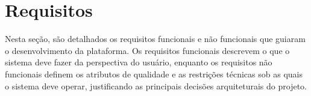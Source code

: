 \section{Requisitos}
\label{sec:requisitos}

Nesta seção, são detalhados os requisitos funcionais e não funcionais que guiaram o desenvolvimento da plataforma. Os requisitos funcionais descrevem o que o sistema deve fazer da perspectiva do usuário, enquanto os requisitos não funcionais definem os atributos de qualidade e as restrições técnicas sob as quais o sistema deve operar, justificando as principais decisões arquiteturais do projeto.
